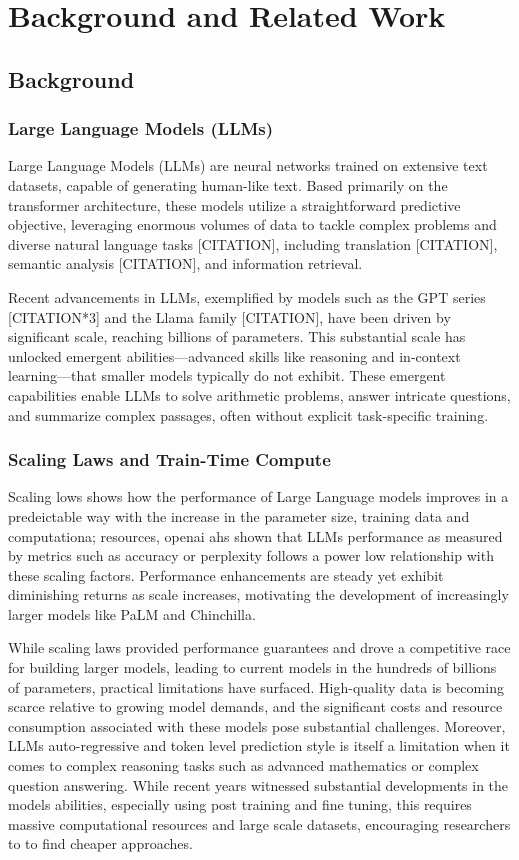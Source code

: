 \chapter{Background and Related Work}

\section{Background}

\subsection{Large Language Models (LLMs)}
Large Language Models (LLMs) are neural networks trained on extensive text datasets, capable of generating human-like text. Based primarily on the transformer architecture, these models utilize a straightforward predictive objective, leveraging enormous volumes of data to tackle complex problems and diverse natural language tasks [CITATION], including translation [CITATION], semantic analysis [CITATION], and information retrieval.

Recent advancements in LLMs, exemplified by models such as the GPT series [CITATION*3] and the Llama family [CITATION], have been driven by significant scale, reaching billions of parameters. This substantial scale has unlocked emergent abilities—advanced skills like reasoning and in-context learning—that smaller models typically do not exhibit. These emergent capabilities enable LLMs to solve arithmetic problems, answer intricate questions, and summarize complex passages, often without explicit task-specific training.

\subsection{Scaling Laws and Train-Time Compute}
Scaling lows shows how the performance of Large Language models improves in a predeictable way with the increase in the parameter size, training data and computationa; resources, openai ahs shown that LLMs performance as measured by metrics such as accuracy or perplexity follows a power low relationship with these scaling factors. Performance enhancements are steady yet exhibit diminishing returns as scale increases, motivating the development of increasingly larger models like PaLM and Chinchilla.

While scaling laws provided performance guarantees and drove a competitive race for building larger models, leading to current models in the hundreds of billions of parameters, practical limitations have surfaced. High-quality data is becoming scarce relative to growing model demands, and the significant costs and resource consumption associated with these models pose substantial challenges. Moreover, LLMs auto-regressive and token level prediction style is itself a limitation when it comes to complex reasoning tasks such as advanced mathematics or complex question answering. While recent years witnessed substantial developments in the models abilities, especially using post training and fine tuning, this requires massive computational resources and large scale datasets, encouraging researchers to to find cheaper approaches.

